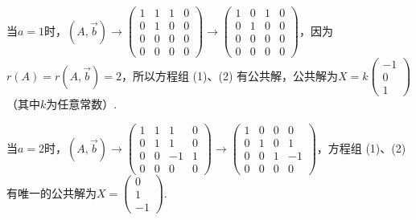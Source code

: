 \begin{exercise}
\begin{exgroup}
\begin{answer}
        当$a=1$时，$(A,\vec{b})\rightarrow\begin{pmatrix}
                1 & 1 & 1 & 0 \\
                0 & 1 & 0 & 0 \\
                0 & 0 & 0 & 0 \\
                0 & 0 & 0 & 0
            \end{pmatrix}\rightarrow\begin{pmatrix}
                1 & 0 & 1 & 0 \\
                0 & 1 & 0 & 0 \\
                0 & 0 & 0 & 0 \\
                0 & 0 & 0 & 0
            \end{pmatrix}$，因为$r(A)=r(A,\vec{b})=2$，所以方程组 (1)、(2) 有公共解，公共解为$X=k\begin{pmatrix} -1 \\ 0  \\ 1 \end{pmatrix}$（其中$k$为任意常数）.

        当$a=2$时，$(A,\vec{b})\rightarrow\begin{pmatrix}
                1 & 1 & 1  & 0 \\
                0 & 1 & 1  & 0 \\
                0 & 0 & -1 & 1 \\
                0 & 0 & 0  & 0
            \end{pmatrix}\rightarrow\begin{pmatrix}
                1 & 0 & 0 & 0  \\
                0 & 1 & 0 & 1  \\
                0 & 0 & 1 & -1 \\
                0 & 0 & 0 & 0
            \end{pmatrix}$，方程组 (1)、(2) 有唯一的公共解为$X=\begin{pmatrix}
                0 \\
                1 \\
                -1
            \end{pmatrix}$.
        \end{answer}
    \end{exgroup}


\end{exercise}
